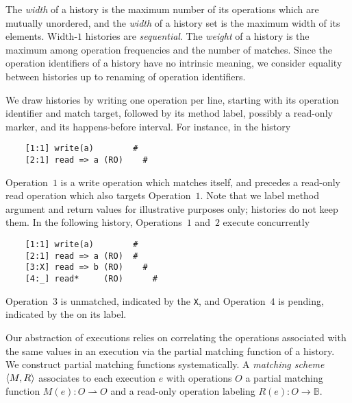 The \emph{width} of a history is the maximum number of its operations which are
mutually unordered, and the \emph{width} of a history set is the maximum width
of its elements. Width-$1$ histories are \emph{sequential}. The \emph{weight}
of a history is the maximum among operation frequencies and the number of
matches. Since the operation identifiers of a history have no intrinsic
meaning, we consider equality between histories up to renaming of operation
identifiers.

\begin{example}
  \label{ex:histories}

  We draw histories by writing one operation per line, starting with its
  operation identifier and match target, followed by its method label,
  possibly a read-only marker, and its happens-before interval. For instance,
  in the history
\begin{verbatim}
    [1:1] write(a)        #
    [2:1] read => a (RO)    #
\end{verbatim}
  Operation~$1$ is a write operation which matches itself, and precedes a
  read-only read operation which also targets Operation~$1$. Note that we
  label method argument and return values for illustrative purposes only;
  histories do not keep them. In the following history, Operations~$1$ and~$2$
  execute concurrently
\begin{verbatim}
    [1:1] write(a)        #
    [2:1] read => a (RO)  #
    [3:X] read => b (RO)    #
    [4:_] read*     (RO)      #
\end{verbatim}
  Operation~$3$ is unmatched, indicated by the {\tt X}, and Operation~$4$ is
  pending, indicated by the {\tt *} on its label.

\end{example}

Our abstraction of executions relies on correlating the operations associated
with the same values in an execution via the partial matching function of a
history. We construct partial matching functions systematically. A
\emph{matching scheme} ${\left\langle{M,R}\right\rangle}$ associates to each execution $e$ with
operations $O$ a partial matching function $M(e): O \rightharpoonup O$ and a
read-only operation labeling $R(e): O \to \mathbb{B}$.

